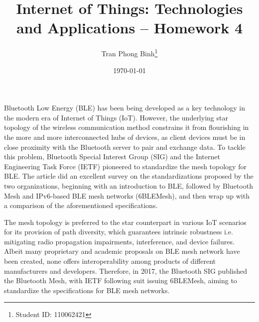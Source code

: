 \documentclass[12pt, a4paper, onside]{article}
\title{\textbf{Internet of Things: Technologies and Applications -- Homework 4}}
\author{Tran Phong Binh\thanks{Student ID: 110062421}}
\affil{Department of Computer Science, National Tsing Hua University}
\date{\today}
\begin{document}
\maketitle

Bluetooth Low Energy (BLE) has been being developed as a key technology in the modern era of Internet of Things (IoT). However, the underlying star topology of the wireless communication method constrains it from flourishing in the more and more interconnected hubs of devices, as client devices must be in close proximity with the Bluetooth server to pair and exchange data. To tackle this problem, Bluetooth Special Interest Group (SIG) and the Internet Engineering Task Force (IETF) pioneered to standardize the mesh topology for BLE. The article \cite{blemesh} did an excellent survey on the standardizations proposed by the two organizations, beginning with an introduction to BLE, followed by Bluetooth Mesh and IPv6-based BLE mesh networks (6BLEMesh), and then wrap up with a comparison of the aforementioned specifications.

The mesh topology is preferred to the star counterpart in various IoT scenarios for its provision of path diversity, which guarantees intrinsic robustness i.e. mitigating radio propagation impairments, interference, and device failures. Albeit many proprietary and academic proposals on BLE mesh network have been created, none offers interoperability among products of different manufacturers and developers. Therefore, in 2017, the Bluetooth SIG published the Bluetooth Mesh, with IETF following suit issuing 6BLEMesh, aiming to standardize the specifications for BLE mesh networks.
\end{document}
